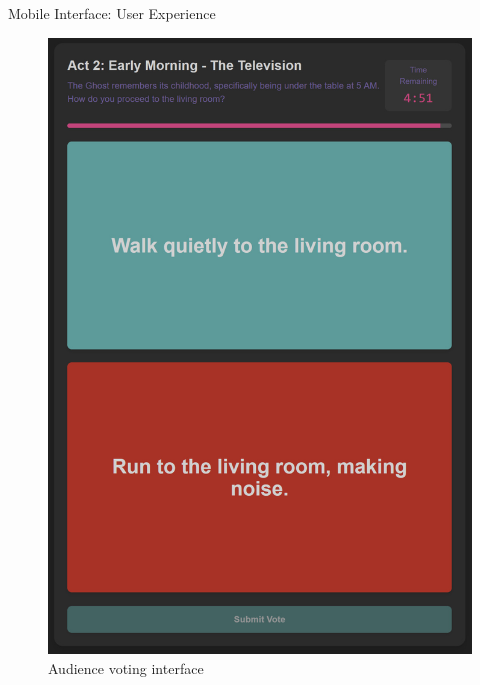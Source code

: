 \documentclass[aspectratio=169]{beamer}
\begin{document}
\begin{frame}{Mobile Interface: User Experience}
    \begin{figure}[h]
        \begin{minipage}{0.45\textwidth}
            \centering
            \includegraphics[height=0.7\textheight]{mobile_screen1.jpg}
            \caption{Audience voting interface}
        \end{minipage}
        \hfill
        \begin{minipage}{0.45\textwidth}
            \centering

\end{minipage}
\end{figure}
\end{frame}
\end{document}
